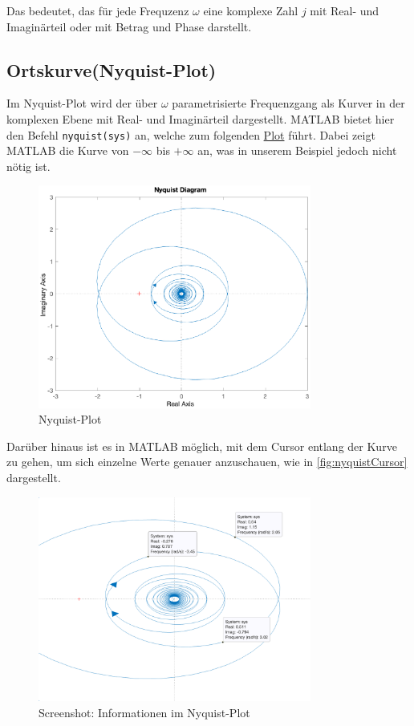 Das bedeutet, das für jede Frequzenz $\omega$ eine komplexe Zahl $j$ mit Real- und Imaginärteil oder mit Betrag und Phase darstellt.

\subsection{Ortskurve(Nyquist-Plot)}
Im Nyquist-Plot wird der über $\omega$ parametrisierte Frequenzgang als Kurver in der komplexen Ebene mit Real- und Imaginärteil dargestellt.
MATLAB bietet hier den Befehl \texttt{nyquist(sys)} an, welche zum folgenden \hyperref[fig:nyquist]{Plot} führt. Dabei zeigt MATLAB die Kurve von $-\infty$ bis $+\infty$ an, was in unserem Beispiel jedoch nicht nötig ist.

\begin{figure}[H]
    \label{fig:nyquist}
    \centering
    \includegraphics[width=0.8\textwidth]{Bilder/NyquistPT1Tt.eps}
    \caption{Nyquist-Plot}
 \end{figure}

 Darüber hinaus ist es in MATLAB möglich, mit dem Cursor entlang der Kurve zu gehen, um sich einzelne Werte genauer anzuschauen, wie in \autoref{fig:nyquistCursor} dargestellt.

 \begin{figure}[H]
    \label{fig:nyquistCursor}
    \centering
    \includegraphics[width=0.8\textwidth]{Bilder/NyquistCursorPT1Tt.png}
    \caption{Screenshot: Informationen im Nyquist-Plot}
 \end{figure}

